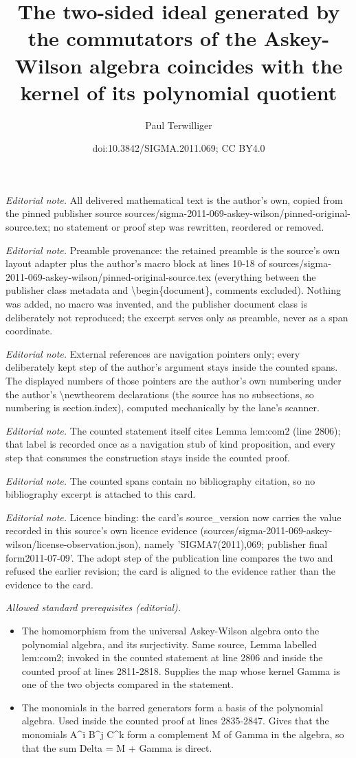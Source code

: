 \documentclass[10pt,a4paper]{amsart}
\title{The two-sided ideal generated by the commutators of the Askey-Wilson algebra coincides with the kernel of its polynomial quotient}
\author{Paul Terwilliger}
\date{doi:10.3842/SIGMA.2011.069; CC BY4.0}
\begin{document}
\maketitle
\noindent\textit{Editorial note.} All delivered mathematical text is the author's own, copied from the pinned publisher source sources/sigma-2011-069-askey-wilson/pinned-original-source.tex; no statement or proof step was rewritten, reordered or removed.\par\medskip
\noindent\textit{Editorial note.} Preamble provenance: the retained preamble is the source's own layout adapter plus the author's macro block at lines 10-18 of sources/sigma-2011-069-askey-wilson/pinned-original-source.tex (everything between the publisher class metadata and \textbackslash{}begin\{document\}, comments excluded). Nothing was added, no macro was invented, and the publisher document class is deliberately not reproduced; the excerpt serves only as preamble, never as a span coordinate.\par\medskip
\noindent\textit{Editorial note.} External references are navigation pointers only; every deliberately kept step of the author's argument stays inside the counted spans. The displayed numbers of those pointers are the author's own numbering under the author's \textbackslash{}newtheorem declarations (the source has no subsections, so numbering is section.index), computed mechanically by the lane's scanner.\par\medskip
\noindent\textit{Editorial note.} The counted statement itself cites Lemma lem:com2 (line 2806); that label is recorded once as a navigation stub of kind proposition, and every step that consumes the construction stays inside the counted proof.\par\medskip
\noindent\textit{Editorial note.} The counted spans contain no bibliography citation, so no bibliography excerpt is attached to this card.\par\medskip
\noindent\textit{Editorial note.} Licence binding: the card's source\_version now carries the value recorded in this source's own licence evidence (sources/sigma-2011-069-askey-wilson/license-observation.json), namely 'SIGMA7(2011),069; publisher final form2011-07-09'. The adopt step of the publication line compares the two and refused the earlier revision; the card is aligned to the evidence rather than the evidence to the card.\par\medskip
\noindent\textit{Allowed standard prerequisites (editorial).}\begin{itemize}
\item The homomorphism from the universal Askey-Wilson algebra onto the polynomial algebra, and its surjectivity. Same source, Lemma labelled lem:com2; invoked in the counted statement at line 2806 and inside the counted proof at lines 2811-2818. Supplies the map whose kernel Gamma is one of the two objects compared in the statement.
\item The monomials in the barred generators form a basis of the polynomial algebra. Used inside the counted proof at lines 2835-2847. Gives that the monomials A\textasciicircum{}i B\textasciicircum{}j C\textasciicircum{}k form a complement M of Gamma in the algebra, so that the sum Delta = M + Gamma is direct.
\end{itemize}\medskip
\end{document}
